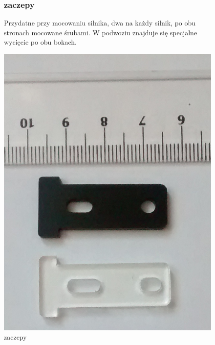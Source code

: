\documentclass[a4paper,11pt]{article}
\def\SCALE{0.6}
\begin{document}
\begin{figure}[H]
	\subsubsection{zaczepy}
	Przydatne przy mocowaniu silnika, dwa na każdy silnik, po obu stronach mocowane śrubami. W 			podwoziu znajduje się specjalne wycięcie po obu bokach.
	
	\centering
	\includegraphics[width=\SCALE
	\paperwidth]{trzymacze}
	\caption{zaczepy}
	

\end{figure}
\end{document}
